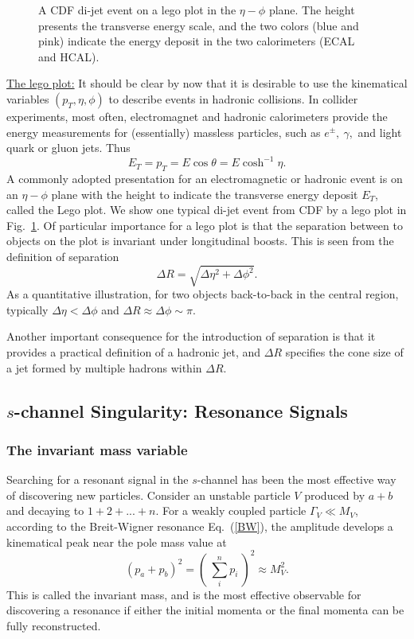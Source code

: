 \documentclass[prd,aps,floats,preprintnumbers,preprint,superscriptaddress,floatfix,nofootinbib]{revtex4}
\def\pt{p_T^{}}
\def\et{E_T^{}}
\def\be{\begin{equation}}
\def\ee{\end{equation}}
\begin{document}
\begin{center}
\begin{figure}[tb]
\caption{A  CDF di-jet event on a  lego plot in the $\eta-\phi$ plane. 
The height presents the transverse energy scale, and the two colors
(blue and pink) indicate the energy deposit in the two calorimeters
(ECAL and HCAL).
\label{fig:lego}}
\end{figure}
\end{center}

\vskip 0.2cm
\noindent
\underline{The lego plot:} 
It should be clear by now that it is desirable to use the kinematical variables 
$(\pt,\eta,\phi)$ to describe events in hadronic collisions.
%
In collider experiments, most often, electromagnet and hadronic calorimeters
provide the energy measurements for (essentially) massless particles, such
as $e^\pm,\ \gamma,$ and light quark or gluon jets. Thus
\be
\et = \pt = E\cos\theta = E\cosh^{-1}\eta.
\ee
A commonly adopted presentation for an electromagnetic or hadronic event
is on an  $\eta-\phi$ plane with the height to indicate the transverse energy
deposit $\et$, called the Lego plot. We show one typical  di-jet event from CDF 
by a lego plot in Fig.~\ref{fig:lego}. Of particular importance for a lego plot 
is that the separation between to objects on the plot is invariant under longitudinal 
boosts. This is seen from the definition of separation
\be
\Delta R= \sqrt{ \Delta\eta^2 + \Delta\phi^2}.
\ee
As a quantitative illustration, for two objects back-to-back in the central region, 
typically $\Delta\eta < \Delta\phi$ and $\Delta R \approx \Delta\phi\sim \pi$.

Another important consequence for the introduction of separation is that it
provides a practical definition of a hadronic jet, and $\Delta R$ specifies the 
cone size of a jet formed by multiple hadrons within $\Delta R$.

\subsection{$s$-channel Singularity: Resonance Signals}

\subsubsection{The invariant mass variable}

Searching for a resonant signal in the $s$-channel has been the most
effective way of discovering new particles. Consider an unstable particle
$V$ produced by $a+b$ and decaying to $1+2+...+n$. For a weakly coupled
particle $\Gamma_V \ll M_V$, according to the Breit-Wigner resonance
Eq.~(\ref{BW}), the amplitude develops a kinematical peak near
the pole mass value at 
\be
(p_a+p_b)^2 = (\ \sum_i^np_i \ )^2 \approx M_V^2.
\ee
This is called the invariant mass, and is the most effective observable 
for discovering a resonance if either the initial momenta or the final
momenta can be fully reconstructed. 
\end{document}
